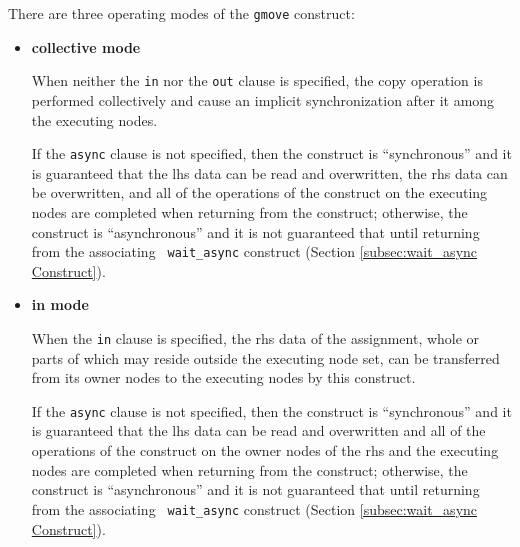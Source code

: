 
There are three operating modes of the {\tt gmove} construct:

\begin{itemize}
 \item {\bf collective mode}

       When neither the {\tt in} nor the {\tt out} clause is specified,
       the copy operation is performed collectively and cause an
       implicit synchronization after it among the executing nodes.

       If the {\tt async} clause is not specified, then the construct is
       ``synchronous'' and it is guaranteed that the lhs data can be
       read and overwritten, the rhs data can be overwritten, and all of
       the operations of the construct on the executing nodes are
       completed when returning from the construct;
       otherwise, the construct is ``asynchronous'' and it is not
       guaranteed that until returning from the associating {\tt
       wait\_async} construct (Section \ref{subsec:wait_async
       Construct}).

%
%

 \item {\bf in mode}

       When the {\tt in} clause is specified, the rhs data of the
       assignment, whole or parts of which may reside outside the
       executing node set, can be transferred from its owner nodes to
       the executing nodes by this construct.

       If the {\tt async} clause is not specified, then the construct is
       ``synchronous'' and it is guaranteed that the lhs data
       can be read and overwritten and all of the operations of the
       construct on the owner nodes of the rhs and the executing nodes
       are completed when returning from the construct;
       otherwise, the construct is ``asynchronous'' and it is not
       guaranteed that until returning from the associating {\tt
       wait\_async} construct (Section \ref{subsec:wait_async
       Construct}).


\end{itemize}
